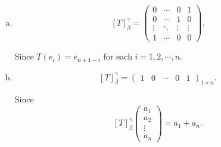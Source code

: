 \begin{Exercise}
\begin{enumerate}[(a)]
\item
\begin{answer}
$$
[T]_{\beta}^{\gamma} = \begin{pmatrix}
0 & \cdots & 0 & 1 \\
0 & \cdots & 1 & 0 \\
\vdots & \ddots & \vdots & \vdots \\
1 & \cdots & 0 & 0
\end{pmatrix}.
$$
\end{answer}
\begin{solution}
Since $T(e_i) = e_{n+1-i}$ for each $i=1,2,\cdots,n$.
\end{solution}

\item
\begin{answer}
$$
[T]_{\beta}^{\gamma} = \begin{pmatrix}
1 & 0 & \cdots & 0 & 1
\end{pmatrix}_{1\times n}.
$$
\end{answer}
\begin{solution}
Since
$$
[T]_{\beta}^{\gamma}\begin{pmatrix}
a_1 \\
a_2 \\
\vdots \\
a_n
\end{pmatrix}
= a_1+a_n.
$$
\end{solution}
\end{enumerate}
\end{Exercise}